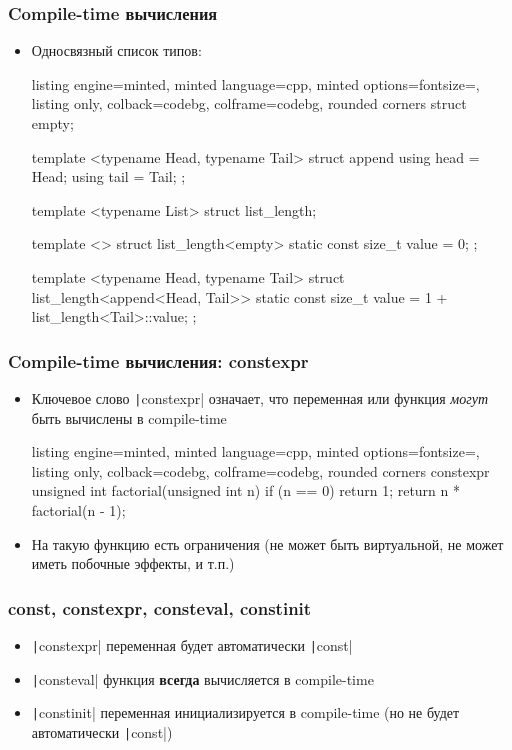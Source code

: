 \documentclass[10pt]{beamer}
\begin{document}
\begin{frame}[fragile]
\frametitle{Compile-time вычисления}
\begin{itemize}
\item Односвязный список типов:
\begin{tcblisting}{listing engine=minted, minted language=cpp, minted options={fontsize=\scriptsize}, listing only, colback=codebg, colframe=codebg, rounded corners}
struct empty{};

template <typename Head, typename Tail>
struct append {
  using head = Head;
  using tail = Tail;
};

template <typename List>
struct list_length;

template <>
struct list_length<empty> {
  static const size_t value = 0;
};

template <typename Head, typename Tail>
struct list_length<append<Head, Tail>> {
  static const size_t value = 1 + list_length<Tail>::value;
};
\end{tcblisting}
\end{itemize}
\end{frame}

\begin{frame}[fragile]
\frametitle{Compile-time вычисления: constexpr}
\begin{itemize}
\item Ключевое слово \texttt|constexpr| означает, что переменная или функция \textit{могут} быть вычислены в compile-time
\pause
{}
\begin{tcblisting}{listing engine=minted, minted language=cpp, minted options={fontsize=\scriptsize}, listing only, colback=codebg, colframe=codebg, rounded corners}
constexpr unsigned int factorial(unsigned int n) {
  if (n == 0)
    return 1;
  return n * factorial(n - 1);
}
\end{tcblisting}
\pause
\item На такую функцию есть ограничения (не может быть виртуальной, не может иметь побочные эффекты, и т.п.)
\end{itemize}
\end{frame}

\begin{frame}[fragile]
\frametitle{const, constexpr, consteval, constinit}
\begin{itemize}
\item \texttt|constexpr| переменная будет автоматически \texttt|const|
\pause
\item \texttt|consteval| функция \textbf{всегда} вычисляется в compile-time
\pause
\item \texttt|constinit| переменная инициализируется в compile-time (но не будет автоматически \texttt|const|)
\end{itemize}
\end{frame}
\end{document}
